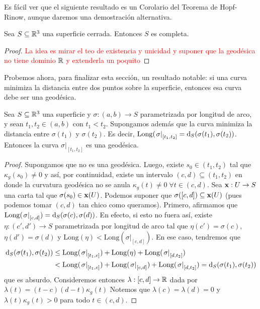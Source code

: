 Es fácil ver que el siguiente resultado es un Corolario del Teorema de Hopf-Rinow, aunque daremos una demostración alternativa.

\begin{prop}
Sea $S\subseteq\mathbb{R}^3$ una superficie cerrada. Entonces $S$ es completa.
\begin{proof}
\textcolor{red}{La idea es mirar el teo de existencia y unicidad y suponer que la geodésica no tiene dominio $\mathbb{R}$ y extenderla un poquito}
\end{proof}
\end{prop}

Probemos ahora, para finalizar esta sección, un resultado notable: si una curva minimiza la distancia entre dos puntos sobre la superficie, entonces esa curva debe ser una geodésica.

\begin{prop}
Sea $S\subseteq\mathbb{R}^3$ una superficie y $\sigma:(a,b)\to S$ parametrizada por longitud de arco, y sean $t_1,t_2\in(a,b)$ con $t_1<t_2$. Supongamos además que la curva minimiza la distancia entre $\sigma(t_1)$ y $\sigma(t_2)$. Es decir, $\mathrm{Long}(\left.\sigma\right|_{[t_1,t_2]}=\mathop{}\!\mathrm{d}_S(\sigma(t_1),\sigma(t_2))$. Entonces la curva $\left.\sigma\right|_{[t_1,t_2]}$ es una geodésica.
\begin{proof}
Supongamos que no es una geodésica. Luego, existe $s_0\in (t_1,t_2)$ tal que $\kappa_g(s_0)\neq 0$ y así, por continuidad, existe un intervalo $(c,d)\subseteq (t_1,t_2)$ en donde la curvatura geodésica no se anula $\kappa_g(t)\neq 0\;\forall t\in (c,d)$. Sea $\operatorname{\mathbf{x}}:U\to S$ una carta tal que $\sigma(s_0)\in\operatorname{\mathbf{x}}(U)$. Podemos suponer que $\sigma([c,d])\subseteq\operatorname{\mathbf{x}}(U)$ (pues podemos tomar $(c,d)$ tan chico como queramos). Primero, afirmamos que $\mathrm{Long}(\left.\sigma\right|_{[c,d]})=\mathop{}\!\mathrm{d}_S(\sigma(c),\sigma(d))$. En efecto, si esto no fuera así, existe $\eta:(c',d')\to S$ parametrizada por longitud de arco tal que $\eta(c')=\sigma(c)$, $\eta(d')=\sigma(d)$ y $\mathrm{Long}(\eta) <\mathrm{Long}(\left.\sigma\right|_{[c,d]})$. En ese caso, tendremos que \begin{align*}\mathop{}\!\mathrm{d}_S(\sigma(t_1),\sigma(t_2))&\leq \mathrm{Long}(\left.\sigma\right|_{[t_1,c]}) + \mathrm{Long}(\eta)+\mathrm{Long}(\left.\sigma\right|_{[d,t_2]})\\ &< \mathrm{Long}(\left.\sigma\right|_{[t_1,c]}) + \mathrm{Long}(\left.\sigma\right|_{[c,d]})+\mathrm{Long}(\left.\sigma\right|_{[d,t_2]}) = \mathop{}\!\mathrm{d}_S(\sigma(t_1),\sigma(t_2))\end{align*}que es absurdo. Consideremos entonces $\lambda:[c,d]\to\mathbb{R}$ dada por $\lambda(t)=(t-c)(d-t)\kappa_g(t)$ Notemos que $\lambda(c)=\lambda(d)=0$ y $\lambda(t)\kappa_g(t)>0$ para todo $t\in (c,d)$.


\end{proof}
\end{prop}
